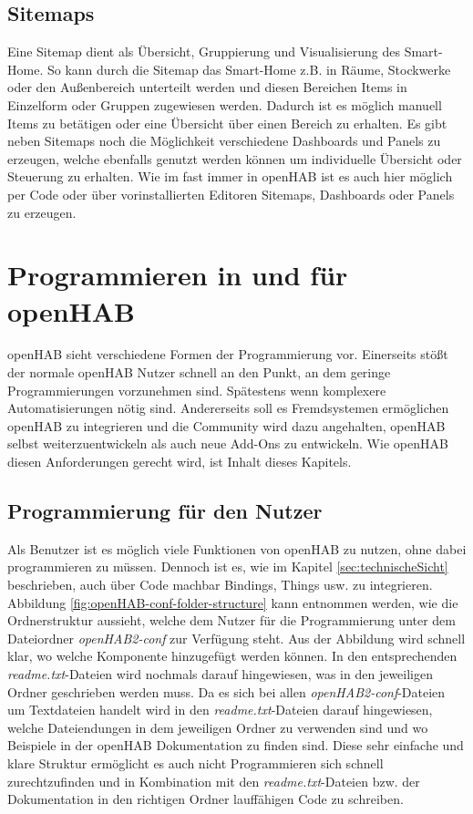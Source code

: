 \subsection{Sitemaps}
Eine Sitemap dient als Übersicht, Gruppierung und Visualisierung des Smart-Home. So kann durch die Sitemap das Smart-Home z.B. in Räume, Stockwerke oder den Außenbereich unterteilt werden und diesen Bereichen Items in Einzelform oder Gruppen zugewiesen werden. Dadurch ist es möglich manuell Items zu betätigen oder eine Übersicht über einen Bereich zu erhalten. Es gibt neben Sitemaps noch die Möglichkeit verschiedene Dashboards und Panels zu erzeugen, welche ebenfalls genutzt werden können um individuelle Übersicht oder Steuerung zu erhalten.
Wie im fast immer in openHAB ist es auch hier möglich per Code oder über vorinstallierten Editoren Sitemaps, Dashboards oder Panels zu erzeugen.

\section{Programmieren in und für openHAB} \label{sec:custom-development}
openHAB sieht verschiedene Formen der Programmierung vor. Einerseits stößt der normale openHAB Nutzer schnell an den Punkt, an dem geringe Programmierungen vorzunehmen sind. Spätestens wenn komplexere Automatisierungen nötig sind. Andererseits soll es Fremdsystemen ermöglichen openHAB zu integrieren und die Community wird dazu angehalten, openHAB selbst weiterzuentwickeln als auch neue Add-Ons zu entwickeln. Wie openHAB diesen Anforderungen gerecht wird, ist Inhalt dieses Kapitels.

\subsection{Programmierung für den Nutzer}
Als Benutzer ist es möglich viele Funktionen von openHAB zu nutzen, ohne dabei programmieren zu müssen. Dennoch ist es, wie im Kapitel \ref{sec:technischeSicht} beschrieben, auch über Code machbar Bindings, Things usw. zu integrieren. Abbildung \ref{fig:openHAB-conf-folder-structure} kann entnommen werden, wie die Ordnerstruktur aussieht, welche dem Nutzer für die Programmierung unter dem Dateiordner \textit{openHAB2-conf} zur Verfügung steht. Aus der Abbildung wird schnell klar, wo welche Komponente hinzugefügt werden können. In den entsprechenden \textit{readme.txt}-Dateien wird nochmals darauf hingewiesen, was in den jeweiligen Ordner geschrieben werden muss. Da es sich bei allen \textit{openHAB2-conf}-Dateien um Textdateien handelt wird in den \textit{readme.txt}-Dateien darauf hingewiesen, welche Dateiendungen in dem jeweiligen Ordner zu verwenden sind und wo Beispiele in der openHAB Dokumentation zu finden sind. Diese sehr einfache und klare Struktur ermöglicht es auch nicht Programmieren sich schnell zurechtzufinden und in Kombination mit den \textit{readme.txt}-Dateien bzw. der Dokumentation in den richtigen Ordner lauffähigen Code zu schreiben.



